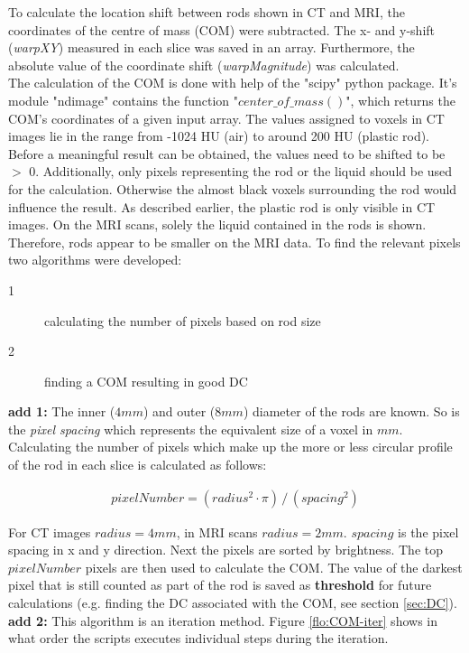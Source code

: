 To calculate the location shift between rods shown in CT and MRI, the coordinates of the centre of mass (COM) were subtracted.
The x- and y-shift (\textit{warpXY}) measured in each slice was saved in an array.
Furthermore, the absolute value of the coordinate shift (\textit{warpMagnitude}) was calculated.
\\
The calculation of the COM is done with help of the "scipy" python package.
It's module "ndimage" contains the function "$center\_of\_mass()$", which returns the COM's coordinates of a given input array.
The values assigned to voxels in CT images lie in the range from -1024 HU (air) to around 200 HU (plastic rod).
Before a meaningful result can be obtained, the values need to be shifted to be $>$ 0.
Additionally, only pixels representing the rod or the liquid should be used for the calculation.
Otherwise the almost black voxels surrounding the rod would influence the result.
As described earlier, the plastic rod is only visible in CT images.
On the MRI scans, solely the liquid contained in the rods is shown.
Therefore, rods appear to be smaller on the MRI data.
To find the relevant pixels two algorithms were developed:

\begin{description}
 \item[1] calculating the number of pixels based on rod size
 \item[2] finding a COM resulting in good DC
\end{description}

\textbf{add 1:}
The inner ($4mm$) and outer ($8mm$) diameter of the rods are known. So is the \textit{pixel spacing} which represents the equivalent size of a voxel in $mm$.
Calculating the number of pixels which make up the more or less circular profile of the rod in each slice is calculated as follows:

\begin{align}
 pixelNumber = (radius^2 \cdot \pi) \, / \, (spacing^2)
\end{align}

For CT images $radius = 4mm$, in MRI scans $radius = 2mm$. $spacing$ is the pixel spacing in x and y direction.
Next the pixels are sorted by brightness. The top $pixelNumber$ pixels are then used to calculate the COM.
The value of the darkest pixel that is still counted as part of the rod is saved as \textbf{threshold} for future calculations (e.g. finding the DC associated with the COM, see section \ref{sec:DC}).
\textbf{add 2:}
This algorithm is an iteration method.
Figure \ref{flo:COM-iter} shows in what order the scripts executes individual steps during the iteration.

